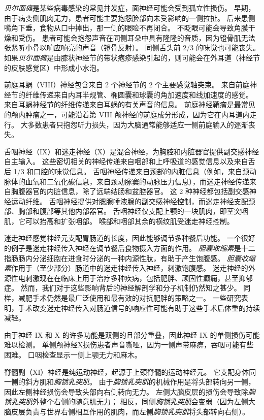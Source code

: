 \textit{贝尔面瘫}是某些病毒感染的常见并发症，面神经可能会受到孤立性损伤。
早期，由于病变侧肌肉无力，患者可能主要抱怨脸部向未受影响的一侧拉扯。
后来患侧嘴角下垂，食物从口中掉出，那一侧的眼睑不再闭合。
不眨眼可能会导致角膜干燥和受伤。
患者可能会抱怨声音在同侧耳朵中具有隆隆的音质，因为镫骨肌无法张紧听小骨以响应响亮的声音（镫骨反射）。
同侧舌头前 2/3 的味觉也可能丧失。
如果\textit{贝尔面瘫}是由膝状神经节的带状疱疹感染引起的，则可能会在外耳道（神经节的皮肤感觉区）中形成小水泡。


前庭耳蜗（VIII）神经包含来自 2 个神经节的 2 个主要感觉轴突束。
来自前庭神经节的纤维传递来自内耳半规管、椭圆囊和球囊的角加速度和线加速度的感觉。
来自耳蜗神经节的纤维传递来自耳蜗的有关声音的信息。
前庭神经鞘瘤是最常见的颅内肿瘤之一，可能沿着第 VIII 颅神经的前庭成分形成，因为它在内耳道内走行。
大多数患者只抱怨听力损失，因为大脑通常能够适应一侧前庭输入的逐渐丧失。


舌咽神经（IX）和迷走神经（X）是混合神经，为胸腔和内脏器官提供副交感神经自主输入。
这些密切相关的神经传递来自咽部和上呼吸道的感觉信息以及来自舌后 1/3 和口腔的味觉信息。
舌咽神经传递来自颈部的内脏信息（例如，来自颈动脉体的血氧和二氧化碳信息，来自颈动脉窦的动脉压力信息），而迷走神经传递来自胸腹器官的内脏信息，除了远端结肠和盆腔器官。
这 2 种神经都包括副交感神经运动纤维。
舌咽神经提供对腮腺唾液腺的副交感神经控制，而迷走神经支配颈部、胸部和腹部等其他内部器官。
舌咽神经仅支配上颚的一块肌肉，即茎突咽肌，它可以抬高和扩张咽部。
喉部和咽部其余的横纹肌受迷走神经控制。


迷走神经感觉神经元支配胃肠道的长度，因此能够调节多种餐后功能。
一个很好的例子是迷走神经传入神经在调节餐后食物摄入方面的作用。
\textit{胆囊收缩素}是十二指肠肠内分泌细胞在进食时分泌的一种内源性肽，有助于产生饱腹感。
\textit{胆囊收缩素}作用于（至少部分）肠道中的迷走神经传入神经，刺激饱腹感。
迷走神经的外源性电刺激现在在临床上用于治疗多种疾病，包括肥胖、顽固性癫痫，甚至抑郁症。
然而，我们对于这些影响背后的神经解剖学和分子机制仍然知之甚少。
同样，减肥手术仍然是最广泛使用和最有效的对抗肥胖的策略之一。
一些研究表明，手术改变迷走神经传入对肠道信号的响应性可能有助于这些手术后体重的持续减轻。


由于神经 IX 和 X 的许多功能是双侧的且部分重叠，因此神经 IX 的单侧损伤可能难以检测。
单侧颅神经X损伤患者声音嘶哑，因为一侧声带麻痹，吞咽可能有些困难。
口咽检查显示一侧上颚无力和麻木。


脊髓副（XI）神经是纯运动神经，起源于上颈脊髓的运动神经元。
它支配身体同一侧的斜方肌和\textit{胸锁乳突肌}。
由于\textit{胸锁乳突肌}的机械作用是将头部转向另一侧，因此左侧神经损伤会导致头部向右侧转向无力。
左侧大脑皮层的损伤会导致除\textit{胸锁乳突肌}外整个右侧的随意肌无力；
相反，同侧\textit{胸锁乳突肌}会变弱（因为左侧大脑皮层负责与世界右侧相互作用的肌肉，而左侧\textit{胸锁乳突肌}将头部转向右侧）。


